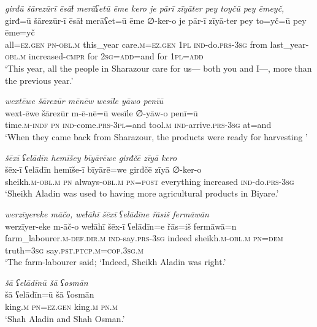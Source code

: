 \ea \label{PM.38}
\textit{girđū šārezūrī ēsāɫ merāʕetū ēme kero je pārī zīyāter pey toyčū pey ēmeyč,} \\ 
\gll girđ=ū šārezūr-ī ēsāɫ merāʕet=ū ēme ∅-ker-o je pār-ī zīyā-ter pey to=yč=ū pey ēme=yč \\ 
 all\textsc{\textsc{=ez.gen}} \textsc{pn}\textsc{-obl}\textsc{.m} this\_year care\textsc{.m}\textsc{\textsc{=ez.gen}} \textsc{1pl} \textsc{ind-}do\textsc{.prs}\textsc{-3sg} from last\_year\textsc{-obl}\textsc{.m} increased\textsc{-cmpr} for \textsc{2sg}\textsc{=add}=and for \textsc{1pl}\textsc{=add} \\ 
\glt `This year, all the people in Sharazour care for us— both you and I—, more than the previous year.'
\z 
 
\ea \label{PM.41}
\textit{wextēwe šārezūr mēnēw wesīle yāwo penīū} \\ 
\gll wext-ēwe šārezūr m-ē-nē=ū wesīle ∅-yāw-o penī=ū \\ 
 time\textsc{.m}\textsc{-indf} \textsc{pn} \textsc{ind-}come\textsc{.prs}\textsc{-3pl}=and tool\textsc{.m} \textsc{ind-}arrive\textsc{.prs}\textsc{-3sg} at=and \\ 
\glt `When they came back from Sharazour, the products were ready for harvesting  '
\z 
 
\ea \label{PM.42}
\textit{šēxī ʕelādīn hemīšey bīyārēwe girđčē zīyā kero} \\ 
\gll šēx-ī ʕelādīn hemīše-ī bīyārē=we girđčē zīyā ∅-ker-o \\ 
 sheikh\textsc{.m}\textsc{-obl}\textsc{.m} \textsc{pn} always\textsc{-obl}\textsc{.m} \textsc{pn}\textsc{=\textsc{post}} everything increased \textsc{ind-}do\textsc{.prs}\textsc{-3sg} \\ 
\glt `Sheikh Aladin was used to having more agricultural products in Biyare.'
\z 
 
\ea \label{PM.44}
\textit{werzīyereke māčo, weɫāhī šēxī ʕelādīne řāsiš fermāwān} \\ 
\gll werzīyer-eke m-āč-o weɫāhī šēx-ī ʕelādīn=e řās=iš fermāwā=n \\ 
 farm\_labourer\textsc{.m}\textsc{-def}\textsc{.dir}\textsc{.m} \textsc{ind-}say\textsc{.prs}\textsc{-3sg} indeed sheikh\textsc{.m}\textsc{-obl}\textsc{.m} \textsc{pn}\textsc{=dem} truth\textsc{=3sg} say\textsc{.pst}\textsc{.ptcp}\textsc{.m}\textsc{=cop}\textsc{.3sg}\textsc{.m} \\ 
\glt `The farm-labourer said; ‘Indeed, Sheikh Aladin was right.'
\z 
 
 \ea \label{DG.1}
\textit{šā ʕelādīnū šā ʕosmān} \\ 
\gll šā ʕelādīn=ū šā ʕosmān \\ 
 king\textsc{.m} \textsc{pn}\textsc{=ez}\textsc{.gen} king\textsc{.m} \textsc{pn}\textsc{.m} \\ 
\glt `Shah Aladin and Shah Osman.'
\z 
 
